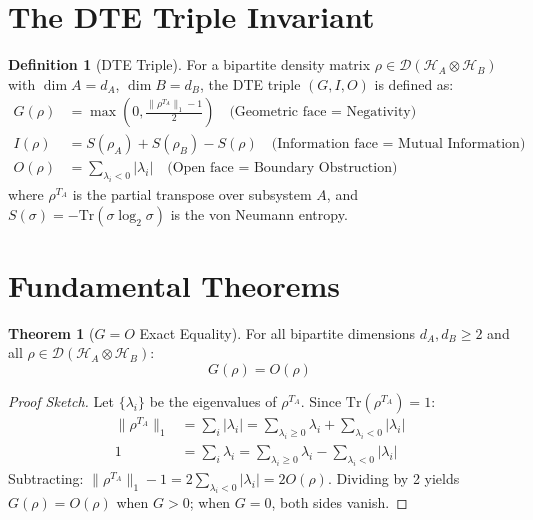\documentclass[11pt,a4paper]{article}
\theoremstyle{definition}
\newtheorem{definition}{Definition}[section]
\newtheorem{theorem}{Theorem}[section]
\begin{document}
\section{The DTE Triple Invariant}
\label{sec:dte}

\begin{definition}[DTE Triple]
For a bipartite density matrix $\rho \in \mathcal{D}(\mathcal{H}_A \otimes \mathcal{H}_B)$ with $\dim A = d_A$, $\dim B = d_B$, the DTE triple $(G, I, O)$ is defined as:
\begin{align}
G(\rho) &= \max\left(0, \frac{\|\rho^{T_A}\|_1 - 1}{2}\right) \quad \text{(Geometric face = Negativity)} \\
I(\rho) &= S(\rho_A) + S(\rho_B) - S(\rho) \quad \text{(Information face = Mutual Information)} \\
O(\rho) &= \sum_{\lambda_i < 0} |\lambda_i| \quad \text{(Open face = Boundary Obstruction)}
\end{align}
where $\rho^{T_A}$ is the partial transpose over subsystem $A$, and $S(\sigma) = -\mathrm{Tr}(\sigma \log_2 \sigma)$ is the von Neumann entropy.
\end{definition}

\section{Fundamental Theorems}
\label{sec:theorems}

\begin{theorem}[$G = O$ Exact Equality]
\label{thm:G_eq_O}
For all bipartite dimensions $d_A, d_B \geq 2$ and all $\rho \in \mathcal{D}(\mathcal{H}_A \otimes \mathcal{H}_B)$:
\begin{equation}
G(\rho) = O(\rho)
\end{equation}
\end{theorem}

\begin{proof}[Proof Sketch]
Let $\{\lambda_i\}$ be the eigenvalues of $\rho^{T_A}$. Since $\mathrm{Tr}(\rho^{T_A}) = 1$:
\begin{align}
\|\rho^{T_A}\|_1 &= \sum_i |\lambda_i| = \sum_{\lambda_i \geq 0} \lambda_i + \sum_{\lambda_i < 0} |\lambda_i| \\
1 &= \sum_i \lambda_i = \sum_{\lambda_i \geq 0} \lambda_i - \sum_{\lambda_i < 0} |\lambda_i|
\end{align}
Subtracting: $\|\rho^{T_A}\|_1 - 1 = 2\sum_{\lambda_i < 0}|\lambda_i| = 2O(\rho)$. Dividing by 2 yields $G(\rho) = O(\rho)$ when $G > 0$; when $G = 0$, both sides vanish.
\end{proof}
\end{document}
